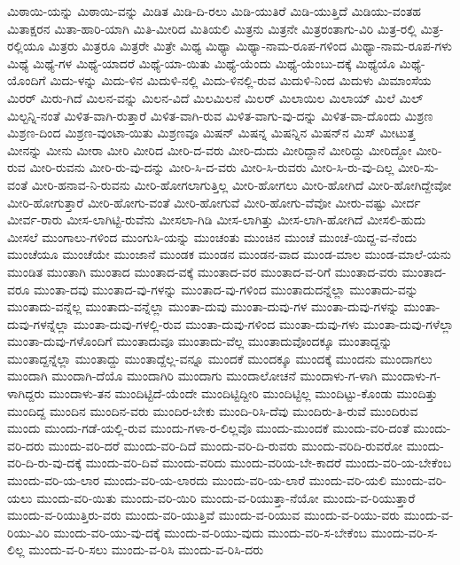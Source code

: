 ಮಿಠಾಯಿ-ಯನ್ನು
ಮಿಠಾಯಿ-ವನ್ನು
ಮಿಡಿತ
ಮಿಡಿ-ದಿ-ರಲು
ಮಿಡಿ-ಯುತಿರೆ
ಮಿಡಿ-ಯುತ್ತಿದೆ
ಮಿಡಿಯು-ವಂತಹ
ಮಿತಾಕ್ಷರನ
ಮಿತಾ-ಹಾರಿ-ಯಾಗಿ
ಮಿತಿ-ಮೀರಿದ
ಮಿತಿಯಲಿ
ಮಿತ್ರನು
ಮಿತ್ರನೇ
ಮಿತ್ರರಂತಾಗು-ವಿರಿ
ಮಿತ್ರ-ರಲ್ಲಿ
ಮಿತ್ರ-ರಲ್ಲಿಯೂ
ಮಿತ್ರರು
ಮಿತ್ರರೂ
ಮಿತ್ರರೇ
ಮಿತ್ರೇ
ಮಿಥ್ಯ
ಮಿಥ್ಯಾ
ಮಿಥ್ಯಾ-ನಾಮ-ರೂಪ-ಗಳಿಂದ
ಮಿಥ್ಯಾ-ನಾಮ-ರೂಪ-ಗಳು
ಮಿಥ್ಯೆ
ಮಿಥ್ಯೆ-ಗಳ
ಮಿಥ್ಯೆ-ಯಾದರೆ
ಮಿಥ್ಯೆ-ಯಾ-ಯಿತು
ಮಿಥ್ಯೆ-ಯೆಂದು
ಮಿಥ್ಯೆ-ಯೆಂಬು-ದಕ್ಕೆ
ಮಿಥ್ಯೆಯೊ
ಮಿಥ್ಯೆ-ಯೊಂದಿಗೆ
ಮಿದು-ಳನ್ನು
ಮಿದು-ಳಿನ
ಮಿದುಳಿ-ನಲ್ಲಿ
ಮಿದು-ಳಿನಲ್ಲಿ-ರುವ
ಮಿದುಳಿ-ನಿಂದ
ಮಿದುಳು
ಮಿಮಾಂಸೆಯ
ಮಿರರ್
ಮಿರು-ಗಿದೆ
ಮಿಲನ-ವನ್ನು
ಮಿಲನ-ವಿದೆ
ಮಿಲಮಿಲನೆ
ಮಿಲರ್
ಮಿಲಾಯಿಲ
ಮಿಲಾಯ್
ಮಿಲೆ
ಮಿಲ್
ಮಿಲ್ಟನ್ನಿ-ನಂತೆ
ಮಿಳಿತ-ವಾಗಿ-ರುತ್ತಾರೆ
ಮಿಳಿತ-ವಾಗಿ-ರುವ
ಮಿಳಿತ-ವಾಗು-ವು-ದನ್ನು
ಮಿಳಿತ-ವಾ-ದೊಂದು
ಮಿಶ್ರಣ
ಮಿಶ್ರಣ-ದಿಂದ
ಮಿಶ್ರಣ-ವುಂಟಾ-ಯಿತು
ಮಿಶ್ರಣವೂ
ಮಿಷನ್
ಮಿಷನ್ನ
ಮಿಷನ್ನಿನ
ಮಿಷನ್‌ನ
ಮಿಸ್
ಮೀಟುತ್ತ
ಮೀನನ್ನು
ಮೀನು
ಮೀರಾ
ಮೀರಿ
ಮೀರಿದ
ಮೀರಿ-ದ-ವರು
ಮೀರಿ-ದುದು
ಮೀರಿದ್ದಾನೆ
ಮೀರಿದ್ದು
ಮೀರಿದ್ದೋ
ಮೀರಿ-ರುವ
ಮೀರಿ-ರುವನು
ಮೀರಿ-ರು-ವು-ದನ್ನು
ಮೀರಿ-ಸಿ-ದ-ವರು
ಮೀರಿ-ಸಿ-ರುವರು
ಮೀರಿ-ಸಿ-ರು-ವು-ದಿಲ್ಲ
ಮೀರಿ-ಸು-ವಂತೆ
ಮೀರಿ-ಹನಾವ-ನಿ-ರುವನು
ಮೀರಿ-ಹೋಗಲಾಗುತ್ತಿಲ್ಲ
ಮೀರಿ-ಹೋಗಲು
ಮೀರಿ-ಹೋಗಿದೆ
ಮೀರಿ-ಹೋಗಿದ್ದೇವೋ
ಮೀರಿ-ಹೋಗುತ್ತಾರೆ
ಮೀರಿ-ಹೋಗು-ವಂತೆ
ಮೀರಿ-ಹೋಗುವೆ
ಮೀರಿ-ಹೋಗು-ವೆವೋ
ಮೀರು-ವಷ್ಟು
ಮೀರ್ದ
ಮೀರ್ವ-ರಾರು
ಮೀಸ-ಲಾಗಿಟ್ಟಿ-ರುವೆನು
ಮೀಸಲಾ-ಗಿಡಿ
ಮೀಸ-ಲಾಗಿತ್ತು
ಮೀಸ-ಲಾಗಿ-ಹೋಗಿದೆ
ಮೀಸಲಿ-ಹುದು
ಮೀಸಲೆ
ಮುಂಗಾಲು-ಗಳಿಂದ
ಮುಂಗುಸಿ-ಯನ್ನು
ಮುಂಚಂತು
ಮುಂಚಿನ
ಮುಂಚೆ
ಮುಂಚೆ-ಯಿದ್ದ-ವ-ನೆಂದು
ಮುಂಚೆಯೂ
ಮುಂಚೆಯೇ
ಮುಂಜಾನೆ
ಮುಂಡಕ
ಮುಂಡನ
ಮುಂಡನ-ವಾದ
ಮುಂಡ-ಮಾಲ
ಮುಂಡ-ಮಾಲೆ-ಯನು
ಮುಂಡಿತ
ಮುಂತಾಗಿ
ಮುಂತಾದ
ಮುಂತಾದ-ವಕ್ಕೆ
ಮುಂತಾದ-ವರ
ಮುಂತಾದ-ವ-ರಿಗೆ
ಮುಂತಾದ-ವರು
ಮುಂತಾದ-ವರೂ
ಮುಂತಾ-ದವು
ಮುಂತಾದ-ವು-ಗಳನ್ನು
ಮುಂತಾದ-ವು-ಗಳಿಂದ
ಮುಂತಾದುದನ್ನೆಲ್ಲಾ
ಮುಂತಾದು-ವನ್ನು
ಮುಂತಾದು-ವನ್ನೆಲ್ಲ
ಮುಂತಾದು-ವನ್ನೆಲ್ಲಾ
ಮುಂತಾ-ದುವು
ಮುಂತಾ-ದುವು-ಗಳ
ಮುಂತಾ-ದುವು-ಗಳನ್ನು
ಮುಂತಾ-ದುವು-ಗಳನ್ನೆಲ್ಲಾ
ಮುಂತಾ-ದುವು-ಗಳಲ್ಲಿ-ರುವ
ಮುಂತಾ-ದುವು-ಗಳಿಂದ
ಮುಂತಾ-ದುವು-ಗಳು
ಮುಂತಾ-ದುವು-ಗಳೆಲ್ಲಾ
ಮುಂತಾ-ದುವು-ಗಳೊಂದಿಗೆ
ಮುಂತಾದುವೂ
ಮುಂತಾದು-ವೆಲ್ಲ
ಮುಂತಾದುವೊಂದಕ್ಕೂ
ಮುಂತಾದ್ದನ್ನು
ಮುಂತಾದ್ದನ್ನೆಲ್ಲಾ
ಮುಂತಾದ್ದು
ಮುಂತಾದ್ದೆಲ್ಲ-ವನ್ನೂ
ಮುಂದಕೆ
ಮುಂದಕ್ಕೂ
ಮುಂದಕ್ಕೆ
ಮುಂದನು
ಮುಂದಾಗಲು
ಮುಂದಾಗಿ
ಮುಂದಾಗಿ-ದೆಯೊ
ಮುಂದಾಗಿರಿ
ಮುಂದಾಗು
ಮುಂದಾಲೋಚನೆ
ಮುಂದಾಳು-ಗ-ಳಾಗಿ
ಮುಂದಾಳು-ಗ-ಳಾಗಿದ್ದರು
ಮುಂದಾಳು-ತನ
ಮುಂದಿಟ್ಟಿದೆ-ಯೆಂದೇ
ಮುಂದಿಟ್ಟಿದ್ದೀರಿ
ಮುಂದಿಟ್ಟಿಲ್ಲ
ಮುಂದಿಟ್ಟು-ಕೊಂಡು
ಮುಂದಿತ್ತು
ಮುಂದಿದ್ದ
ಮುಂದಿನ
ಮುಂದಿನ-ವರು
ಮುಂದಿರ-ಬೇಕು
ಮುಂದಿ-ರಿಸಿ-ದೆವು
ಮುಂದಿರು-ತಿ-ರುವೆ
ಮುಂದಿರುವ
ಮುಂದು
ಮುಂದು-ಗಡೆ-ಯಲ್ಲಿ-ರುವ
ಮುಂದು-ಗಳಾ-ರ-ಲಿಲ್ಲವೊ
ಮುಂದು-ಮುಂದಕೆ
ಮುಂದು-ವರಿ-ದಂತೆ
ಮುಂದು-ವರಿ-ದರು
ಮುಂದು-ವರಿ-ದರೆ
ಮುಂದು-ವರಿ-ದಿದೆ
ಮುಂದು-ವರಿ-ದಿ-ರುವರು
ಮುಂದು-ವರಿದಿ-ರುವರೋ
ಮುಂದು-ವರಿ-ದಿ-ರು-ವು-ದಕ್ಕೆ
ಮುಂದು-ವರಿ-ದಿವೆ
ಮುಂದು-ವರಿದು
ಮುಂದು-ವರಿಯ-ಬೇ-ಕಾದರೆ
ಮುಂದು-ವರಿ-ಯ-ಬೇಕೆಂಬ
ಮುಂದು-ವರಿ-ಯ-ಲಾರ
ಮುಂದು-ವರಿ-ಯ-ಲಾರದು
ಮುಂದು-ವರಿ-ಯ-ಲಾರೆ
ಮುಂದು-ವರಿ-ಯಲಿ
ಮುಂದು-ವರಿ-ಯಲು
ಮುಂದು-ವರಿ-ಯಿತು
ಮುಂದು-ವರಿ-ಯಿರಿ
ಮುಂದು-ವ-ರಿಯುತ್ತಾ-ನೆಯೋ
ಮುಂದು-ವ-ರಿಯುತ್ತಾರೆ
ಮುಂದು-ವ-ರಿಯುತ್ತಿರು-ವರು
ಮುಂದು-ವರಿ-ಯುತ್ತಿವೆ
ಮುಂದು-ವ-ರಿಯುವ
ಮುಂದು-ವ-ರಿಯು-ವರು
ಮುಂದು-ವ-ರಿಯು-ವಿರಿ
ಮುಂದು-ವರಿ-ಯು-ವು-ದಕ್ಕೆ
ಮುಂದು-ವ-ರಿಯು-ವುದು
ಮುಂದು-ವರಿ-ಸ-ಬೇಕೆಂಬ
ಮುಂದು-ವರಿ-ಸ-ಲಿಲ್ಲ
ಮುಂದು-ವ-ರಿ-ಸಲು
ಮುಂದು-ವ-ರಿಸಿ
ಮುಂದು-ವ-ರಿಸಿ-ದರು
